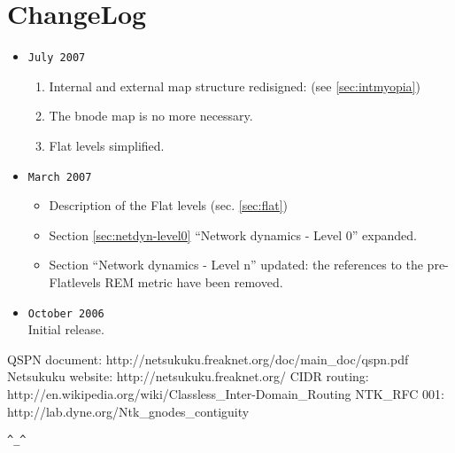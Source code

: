 \documentclass[a4paper]{article}
\newcommand{\href}[2]{ #1 }
\begin{document}
\section{ChangeLog}
\begin{itemize}
	\item \verb|July 2007|
		\begin{enumerate}
			\item Internal and external map structure redisigned:
				(see \ref{sec:intmyopia})
			\item The bnode map is no more necessary.
			\item Flat levels simplified.
		\end{enumerate}
	\item \verb|March 2007|
		\begin{itemize}
			\item Description of the Flat levels (sec. \ref{sec:flat})
			\item Section \ref{sec:netdyn-level0} ``Network dynamics - Level 0'' expanded.
			\item Section ``Network
				dynamics - Level n'' updated: the references to
				the pre-Flatlevels REM metric have been
				removed.
		\end{itemize}
	\item \verb|October 2006|\\
		Initial release.
\end{itemize}

\begin{thebibliography}{99}
	 QSPN document:
		\href{http://netsukuku.freaknet.org/doc/main\_doc/qspn.pdf}{qspn.pdf}
	 Netsukuku website:
		\href{http://netsukuku.freaknet.org/}{http://netsukuku.freaknet.org/}
	 CIDR routing:
		\href{http://en.wikipedia.org/wiki/Classless\_Inter-Domain\_Routing}{Classless\_Inter-Domain\_Routing in Wikipedia}
	 NTK\_RFC 001:
		\href{http://lab.dyne.org/Ntk\_gnodes\_contiguity}{Gnode contiguity}
\end{thebibliography}
\newpage

\begin{center}
\verb|^_^|
\end{center}
\end{document}
